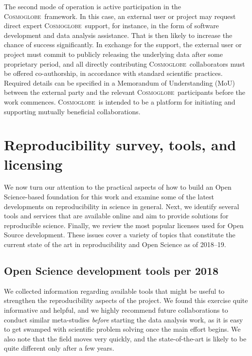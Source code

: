 \documentclass[twocolumn]{openjournal}
\newcommand{\cosmoglobe}{\textsc{Cosmoglobe}}
\begin{document}
The second mode of operation is active participation in the \cosmoglobe\
framework. In this case, an external user or project may request direct expert
\cosmoglobe\ support, for instance, in the form of software development and
data analysis assistance. That is then likely to increase the chance of success
significantly. In exchange for the support, the external user or project must
commit to publicly releasing the underlying data after some proprietary period,
and all directly contributing \cosmoglobe\ collaborators must be offered
co-authorship, in accordance with standard scientific practices. Required
details can be specified in a Memorandum of Understanding (MoU) between the
external party and the relevant \cosmoglobe\ participants before the work
commences. \cosmoglobe\ is intended to be a platform for initiating and
supporting mutually beneficial collaborations.

\section{Reproducibility survey, tools, and licensing}
\label{sec:reproducibility}

We now turn our attention to the practical aspects of how to build an Open
Science-based foundation for this work and examine some of the latest
developments on reproducibility in science in general. Next, we identify
several tools and services that are available online and aim to provide
solutions for reproducible science. Finally, we review the most popular
licenses used for Open Source development. These issues cover a variety of
topics that constitute the current state of the art in reproducibility and Open
Science as of 2018--19.

\subsection{Open Science development tools per 2018}

We collected information regarding available tools that might be useful to
strengthen the reproducibility aspects of the project. We found this exercise
quite informative and helpful, and we highly recommend future collaborations to
conduct similar meta-studies \emph{before} starting the data analysis work, as
it is easy to get swamped with scientific problem solving once the main effort
begins. We also note that the field moves very quickly, and the
state-of-the-art is likely to be quite different only after a few years.
\end{document}
